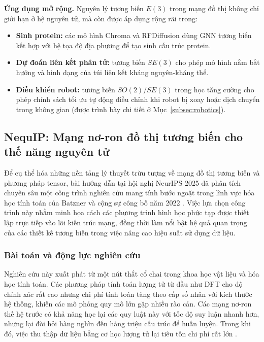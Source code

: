 \textbf{Ứng dụng mở rộng.} Nguyên lý tương biến $E(3)$ trong mạng đồ thị không chỉ giới hạn ở hệ nguyên tử, mà còn được áp dụng rộng rãi trong:

\begin{itemize}
    \item \textbf{Sinh protein:} các mô hình Chroma và RFDiffusion dùng GNN tương biến kết hợp với hệ tọa độ địa phương để tạo sinh cấu trúc protein.
    \item \textbf{Dự đoán liên kết phân tử:} tương biến $SE(3)$ cho phép mô hình nắm bắt hướng và hình dạng của túi liên kết kháng nguyên-kháng thể.
    \item \textbf{Điều khiển robot:} tương biến $SO(2)$/$SE(3)$ trong học tăng cường cho phép chính sách tối ưu tự động điều chỉnh khi robot bị xoay hoặc dịch chuyển trong không gian (được trình bày chi tiết ở Mục~\ref{subsec:robotics}).
\end{itemize}

\subsection{NequIP: Mạng nơ-ron đồ thị tương biến cho thế năng nguyên tử}
\label{subsec:nequip-paper}

Để cụ thể hóa những nền tảng lý thuyết trừu tượng về mạng đồ thị tương biến và phương pháp tensor, bài hướng dẫn tại hội nghị NeurIPS 2025 đã phân tích chuyên sâu một công trình nghiên cứu mang tính bước ngoặt trong lĩnh vực hóa học tính toán của Batzner và cộng sự công bố năm 2022 \cite{batzner2022nequip}. Việc lựa chọn công trình này nhằm minh họa cách các phương trình hình học phức tạp được thiết lập trực tiếp vào lõi kiến trúc mạng, đồng thời làm nổi bật hệ quả quan trọng của các thiết kế tương biến trong việc nâng cao hiệu suất sử dụng dữ liệu.

\subsubsection{Bài toán và động lực nghiên cứu}

Nghiên cứu này xuất phát từ một nút thắt cổ chai trong khoa học vật liệu và hóa học tính toán. Các phương pháp tính toán lượng tử từ đầu như DFT cho độ chính xác rất cao nhưng chi phí tính toán tăng theo cấp số nhân với kích thước hệ thống, khiến các mô phỏng quy mô lớn gặp nhiều rào cản. Các mạng nơ-ron thế hệ trước có khả năng học lại các quy luật này với tốc độ suy luận nhanh hơn, nhưng lại đòi hỏi hàng nghìn đến hàng triệu cấu trúc để huấn luyện. Trong khi đó, việc thu thập dữ liệu bằng cơ học lượng tử lại tiêu tốn chi phí rất lớn \cite{batzner2022nequip}.

